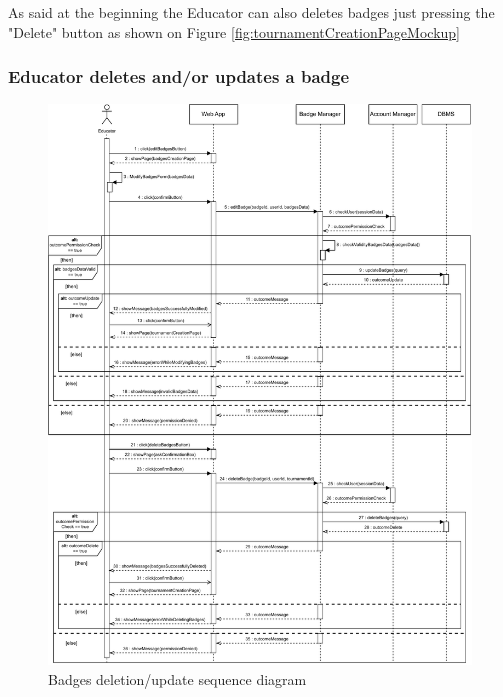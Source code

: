 \documentclass{article}
\begin{document}
{        As said at the beginning the Educator can also deletes
        badges just pressing the "Delete" button as shown on Figure
        \ref{fig:tournamentCreationPageMockup}

    \subsubsection{Educator deletes and/or updates a badge}
        \begin{figure}[H]
            \centering
            \hspace*{-0.7cm}\includegraphics[scale=0.60]{Sequence/Sequence5DD.pdf}
            \caption{Badges deletion/update sequence diagram}
            \label{fig:Sequence5DD}
        \end{figure}
        
}
\end{document}
